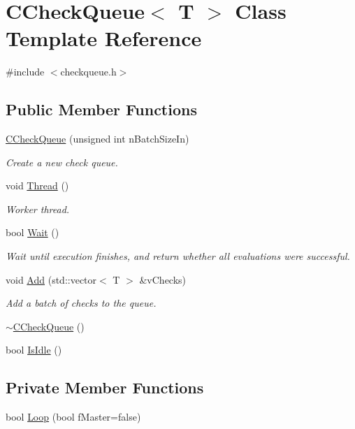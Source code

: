 \hypertarget{class_c_check_queue}{}\section{C\+Check\+Queue$<$ T $>$ Class Template Reference}
\label{class_c_check_queue}


{\ttfamily \#include $<$checkqueue.\+h$>$}

\subsection*{Public Member Functions}
\begin{DoxyCompactItemize}
\item 
\mbox{\hyperlink{class_c_check_queue_ad0e6a979f8433c05770350bc6b90a849}{C\+Check\+Queue}} (unsigned int n\+Batch\+Size\+In)
\begin{DoxyCompactList}\small\item\em Create a new check queue. \end{DoxyCompactList}\item 
void \mbox{\hyperlink{class_c_check_queue_ad3602cd305b07612e634363b31c1d46c}{Thread}} ()
\begin{DoxyCompactList}\small\item\em Worker thread. \end{DoxyCompactList}\item 
bool \mbox{\hyperlink{class_c_check_queue_a4ff3e0e8241491efa1803eeb3a53e7fa}{Wait}} ()
\begin{DoxyCompactList}\small\item\em Wait until execution finishes, and return whether all evaluations were successful. \end{DoxyCompactList}\item 
void \mbox{\hyperlink{class_c_check_queue_aee8e83bcdeef17740937e6c1dc84c478}{Add}} (std\+::vector$<$ T $>$ \&v\+Checks)
\begin{DoxyCompactList}\small\item\em Add a batch of checks to the queue. \end{DoxyCompactList}\item 
\mbox{\hyperlink{class_c_check_queue_a05820838bd337f6e882ad21ac590d524}{$\sim$\+C\+Check\+Queue}} ()
\item 
bool \mbox{\hyperlink{class_c_check_queue_a3c091928859b0936331341edeb977325}{Is\+Idle}} ()
\end{DoxyCompactItemize}
\subsection*{Private Member Functions}
\begin{DoxyCompactItemize}
\item 
bool \mbox{\hyperlink{class_c_check_queue_a20cdd097d93da6deeca6e5721a758165}{Loop}} (bool f\+Master=false)
\end{DoxyCompactItemize}
